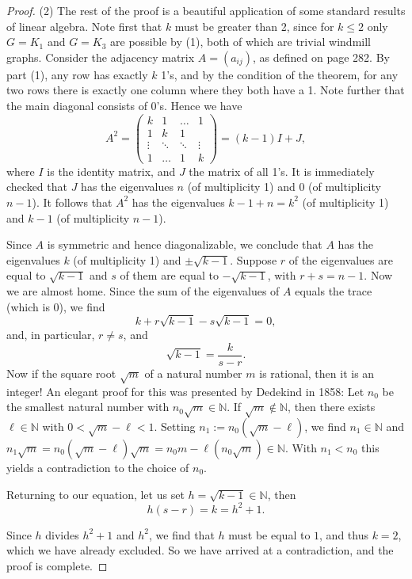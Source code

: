 \begin{proof}
(2) The rest of the proof is a beautiful application of some standard results of linear algebra.
Note first that $k$ must be greater than 2, since for $k \leq 2$ only $G = K_1$ and $G = K_3$
are possible by (1), both of which are trivial windmill graphs. Consider the adjacency
matrix $A = (a_{ij})$, as defined on page 282. By part (1), any row has exactly $k$ 1's,
and by the condition of the theorem, for any two rows there is exactly one column where they
both have a 1. Note further that the main diagonal consists of 0's. Hence we have
\[
A^2 = \begin{pmatrix}
k & 1 & \dots & 1 \\
1 & k & 1 \\
\vdots & \ddots & \ddots & \vdots \\
1 & \dots & 1 & k
\end{pmatrix} = (k - 1) I + J,
\]
where $I$ is the identity matrix, and $J$ the matrix of all 1's. It is immediately checked
that $J$ has the eigenvalues $n$ (of multiplicity 1) and $0$ (of multiplicity $n - 1$). It
follows that $A^2$ has the eigenvalues $k - 1 + n = k^2$ (of multiplicity 1) and $k - 1$
(of multiplicity $n - 1$).

Since $A$ is symmetric and hence diagonalizable, we conclude that $A$ has the eigenvalues $k$
(of multiplicity 1) and $\pm \sqrt{k - 1}$. Suppose $r$ of the eigenvalues are equal to
$\sqrt{k - 1}$ and $s$ of them are equal to $-\sqrt{k - 1}$, with $r + s = n - 1$.
Now we are almost home. Since the sum of the eigenvalues of $A$ equals the trace (which is 0),
we find
\[
k + r\sqrt{k - 1} - s\sqrt{k - 1} = 0,
\]
and, in particular, $r \neq s$, and
\[
\sqrt{k - 1} = \frac{k}{s - r}.
\]
Now if the square root $\sqrt{m}$ of a natural number $m$ is rational, then it is an integer!
An elegant proof for this was presented by Dedekind in 1858: Let $n_0$ be the smallest natural
number with $n_0 \sqrt{m} \in \mathbb{N}$. If $\sqrt{m} \not\in \mathbb{N}$, then there exists
$\ell \in \mathbb{N}$ with $0 < \sqrt{m} - \ell < 1$. Setting $n_1 := n_0(\sqrt{m} - \ell)$,
we find $n_1 \in \mathbb{N}$ and
$n_1 \sqrt{m} = n_0 (\sqrt{m} - \ell) \sqrt{m} = n_0 m - \ell (n_0 \sqrt{m}) \in \mathbb{N}$.
With $n_1 < n_0$ this yields a contradiction to the choice of $n_0$.

Returning to our equation, let us set $h = \sqrt{k - 1} \in \mathbb{N}$, then
\[
h(s - r) = k = h^2 + 1.
\]

Since $h$ divides $h^2 + 1$ and $h^2$, we find that $h$ must be equal to $1$, and thus $k = 2$,
which we have already excluded. So we have arrived at a contradiction, and the proof is complete.
\end{proof}
